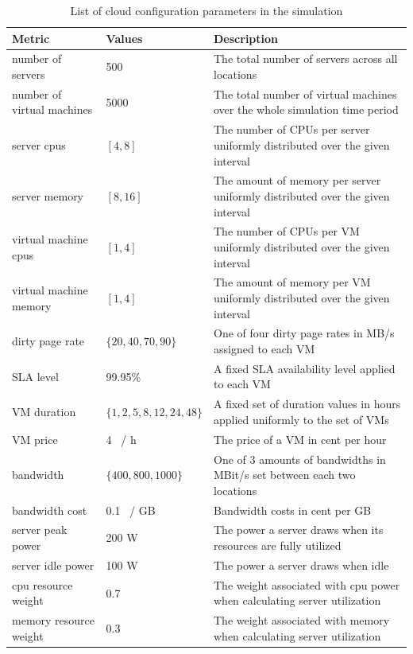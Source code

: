 \begin{table}[htbp]
\centering
\begin{tabularx}{\textwidth}{l|l|X}
	Metric & Values & Description \\
\hline
	number of servers & 500 & The total number of servers across all locations \\
	number of virtual machines & 5000 & The total number of virtual machines over the whole simulation time period \\
	server cpus & $[4,8]$ & The number of CPUs per server uniformly distributed over the given interval \\
	server memory & $[8,16]$ & The amount of memory per server uniformly distributed over the given interval \\
	virtual machine cpus & $[1,4]$ & The number of CPUs per VM uniformly distributed over the given interval \\
	virtual machine memory & $[1,4]$ & The amount of memory per VM uniformly distributed over the given interval \\
	dirty page rate & $\{20,40,70,90\}$ & One of four dirty page rates in MB/s assigned to each VM \\
	SLA level & 99.95\% & A fixed SLA availability level applied to each VM \\
	VM duration & $\{1,2,5,8,12,24,48\}$ & A fixed set of duration values in hours applied uniformly to the set of VMs \\
	VM price & 4 \cent \ / h & The price of a VM in cent per hour \\
	bandwidth & $\{400,800,1000\}$ & One of 3 amounts of bandwidths in MBit/s set between each two locations \\
	bandwidth cost & 0.1 \cent \ / GB & Bandwidth costs in cent per GB \\
	server peak power & 200 W & The power a server draws when its resources are fully utilized \\
	server idle power & 100 W & The power a server draws when idle \\
	cpu resource weight & 0.7 & The weight associated with cpu power when calculating server utilization \\
	memory resource weight & 0.3 & The weight associated with memory when calculating server utilization \\
\end{tabularx}
\caption{List of cloud configuration parameters in the simulation}
\label{tab:list_of_cloud_metrics}
\end{table}

